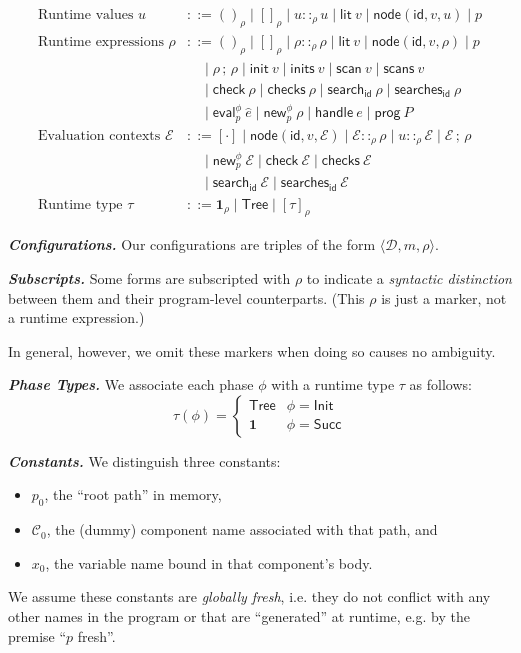 \documentclass{article}
\newcommand{\mf}[1]{\mathsf{#1}}
\newcommand{\mc}[1]{\mathcal{#1}}
\newcommand{\mb}[1]{\mathbf{#1}}
\newcommand{\tb}[1]{\textbf{#1}}
\newcommand{\semi}{\,;\,}
\newcommand{\trip}[3]{\langle #1, #2, #3 \rangle}
\newcommand{\rtp}{\tau}
\newcommand{\tone}{\mb{1}}
\newcommand{\C}{\mc{C}}
\newcommand{\D}{\mc{D}}
\newcommand{\E}{\mc{E}}
\newcommand{\elit}[1]{\mf{lit}\ #1}
\newcommand{\enode}[3]{\mf{node}(\mf{#1}, #2, #3)}
\newcommand{\esearch}[2]{\mf{search}_\mf{#1}\ #2}
\newcommand{\esearches}[2]{\mf{searches}_\mf{#1}\ #2}
\newcommand{\eeval}[3]{\mf{eval}^{#1}_{#2}\ #3}
\newcommand{\enew}[3]{\mf{new}^{#1}_{#2}\ #3}
\newcommand{\ehdl}[1]{\mf{handle}\ #1}
\newcommand{\eprog}[1]{\mf{prog}\ #1}
\newcommand{\einit}[1]{\mf{init}\ #1}
\newcommand{\einits}[1]{\mf{inits}\ #1}
\newcommand{\escan}[1]{\mf{scan}\ #1}
\newcommand{\escans}[1]{\mf{scans}\ #1}
\newcommand{\echk}[1]{\mf{check}\ #1}
\newcommand{\echks}[1]{\mf{checks}\ #1}
\begin{document}
\begin{align*}
\text{Runtime values } u
&::= ()_\rho \mid []_\rho \mid u ::_\rho u
\mid \elit{v} \mid \enode{id}{v}{u}
\mid p\\
\text{Runtime expressions } \rho
&::= ()_\rho \mid []_\rho \mid \rho ::_\rho \rho
\mid \elit{v} \mid \enode{id}{v}{\rho}
\mid p\\
&\quad\mid \rho \semi \rho \mid
\einit{v} \mid \einits{v} \mid \escan{v} \mid \escans{v}\\
&\quad\mid \echk{\rho} \mid \echks{\rho}
\mid \esearch{id}{\rho} \mid \esearches{id}{\rho}\\
&\quad\mid \eeval{\phi}{p}{\hat{e}} \mid \enew{\phi}{p}{\rho}
\mid \ehdl{e} \mid \eprog{P}\\
\text{Evaluation contexts } \E
&::= [\cdot] \mid \enode{id}{v}{\E} \mid \E ::_\rho \rho
\mid u ::_\rho \E \mid \E \semi \rho\\
&\quad\mid \enew{\phi}{p}{\E}
\mid \echk{\E} \mid \echks{\E}\\
&\quad\mid \esearch{id}{\E} \mid \esearches{id}{\E}\\
\text{Runtime type } \rtp &::= \tone_\rho \mid \mf{Tree}
\mid [\rtp]_\rho
\end{align*}

\tb{\emph{Configurations.}} Our configurations are triples of the form
$\trip{\D}{m}{\rho}$.

\tb{\emph{Subscripts.}} 
Some forms are subscripted with $\rho$ to indicate a
\emph{syntactic distinction} between them and their program-level
counterparts. (This $\rho$ is just a marker, not a runtime expression.)

In general, however, we omit these markers when doing so causes no ambiguity.

\tb{\emph{Phase Types.}}
We associate each phase $\phi$ with a runtime type $\rtp$ as follows:
\[
\rtp(\phi) = \begin{cases}
    \mf{Tree} & \phi=\mf{Init}\\
    \tone & \phi=\mf{Succ}
\end{cases}
\]

\tb{\emph{Constants.}} We distinguish three constants:
\begin{itemize}
\item $p_0$, the ``root path'' in memory,
\item $\C_0$, the (dummy) component name associated with that path, and
\item $x_0$, the variable name bound in that component's body.
\end{itemize}
We assume these constants are \emph{globally fresh},
i.e. they do not conflict with any other names in the program
or that are ``generated'' at runtime, e.g. by the premise ``$p$ fresh''.
\end{document}
